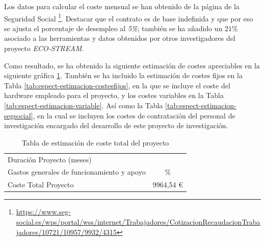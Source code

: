 Los datos para calcular el coste mensual se han obtenido de la página de la Seguridad Social \footnote{\url{https://www.seg-social.es/wps/portal/wss/internet/Trabajadores/CotizacionRecaudacionTrabajadores/10721/10957/9932/4315}}. Destacar que el contrato es de base indefinida y que por eso se ajusta el porcentaje de desempleo al \textit{5\%}; también se ha añadido un $21\%$ asociado a las herramientas y datos obtenidos por otros investigadores del proyecto \textit{ECO-STREAM}. 

Como resultado, se ha obtenido la siguiente estimación de costes apreciables en la siguiente gráfica \ref{tab:espect-estimacion-costesfinal}. También se ha incluido la estimación de costes fijos en la Tabla \ref{tab:espect-estimacion-costesfijos}, en la que se incluye el coste del hardware empleado para el proyecto, y los costes variables en la Tabla \ref{tab:espect-estimacion-variable}. Así como la Tabla \ref{tab:espect-estimacion-segsocial}, en la cual se incluyen los costes de contratación del personal de investigación encargado del desarrollo de este proyecto de investigación.

\begin{table}[H]
 \begin{tabularx}{\textwidth}{|>{\centering\arraybackslash}X|>{\centering\arraybackslash}c|}
 \hline
 \rowcolor[HTML]{9B9B9B}
 \multicolumn{2}{|c|}{\cellcolor[HTML]{9B9B9B}Datos del Proyecto} \\ \hline
 Duración Proyecto (meses) & 5 \\ \hline
 Gastos generales de funcionamiento y apoyo & 21 \% \\ \hline
 \rowcolor[HTML]{E5FF0A}
 \cellcolor[HTML]{E5FF0A}Coste Total Proyecto & \cellcolor[HTML]{E5FF0A}9964,54 € \\ \hline
 \end{tabularx}
 \caption{Tabla de estimación de coste total del proyecto}
 \label{tab:espect-estimacion-costesfinal}
\end{table}

